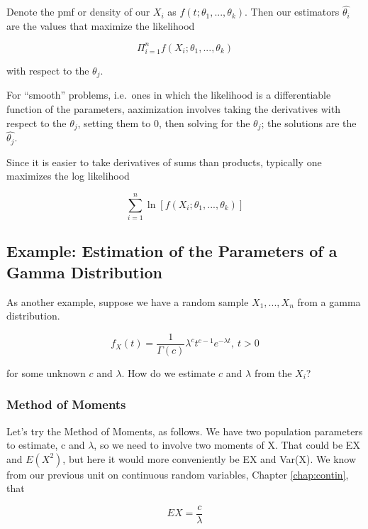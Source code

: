 Denote the pmf or density of our $X_i$ as $f(t;\theta_1,...,\theta_k)$.
Then our estimators $\widehat{\theta_i}$ are the values that maximize
the likelihood

\begin{equation}
\Pi_{i=1}^n f(X_i; \theta_1,...,\theta_k)
\end{equation}

with respect to the $\theta_j$.  

For ``smooth'' problems, i.e.\ ones in which the likelihood is a
differentiable function of the parameters, aaximization involves taking
the derivatives with respect to the $\theta_j$, setting them to 0, then
solving for the $\theta_j$; the solutions are the
$\widehat{\theta_j}$.  

Since it is easier to take derivatives of sums than products, typically
one maximizes the log likelihood

\begin{equation}
\label{loglike}
\sum_{i=1}^n \ln[f(X_i; \theta_1,...,\theta_k)]
\end{equation}

\subsection{Example:  Estimation of the Parameters of a Gamma Distribution}
\label{gammamle}

As another example, suppose we have a random sample $X_1,...,X_n$ from 
a gamma distribution.

\begin{equation}
\label{gamma}
f_X(t) = \frac{1}{\Gamma(c)} \lambda^c t^{c-1} e^{-\lambda t}, ~ t > 0
\end{equation}

for some unknown $c$ and $\lambda$.  How do we estimate $c$ and
$\lambda$ from the $X_i$?

\subsubsection{Method of Moments}

Let's try the Method of Moments, as follows.  We have two population
parameters to estimate, c and $\lambda$, so we need to involve two
moments of X.  That could be EX and $E(X^2)$, but here it would more
conveniently be EX and Var(X).  We know from our previous unit on
continuous random variables, Chapter \ref{chap:contin}, that 

\begin{equation}
EX = \frac{c}{\lambda}
\end{equation}

